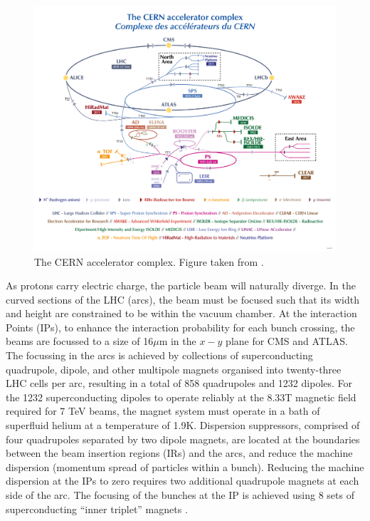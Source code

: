 \begin{figure}[t]
    \centering
    \includegraphics[width=\textwidth]{plots/lhc/CCC-v2022.png}
    \caption{The CERN accelerator complex. Figure taken from \cite{LHC:CCC}.\label{fig:LHC:ccc}}
\end{figure}
As protons carry electric charge, the particle beam will naturally diverge. In the curved sections of the LHC (arcs), the beam must be focused such that its width and height are constrained to be within the vacuum chamber. At the interaction Points (IPs), to enhance the interaction probability for each bunch crossing, the beams are focussed to a size of 16$\mu$m in the $x-y$ plane for CMS and ATLAS. The focussing in the arcs is achieved by collections of superconducting quadrupole, dipole, and other multipole magnets organised into twenty-three LHC cells per arc, resulting in a total of 858 quadrupoles and 1232 dipoles. For the 1232 superconducting dipoles to operate reliably at the 8.33T magnetic field required for 7 TeV beams, the magnet system must operate in a bath of superfluid helium at a temperature of 1.9K. Dispersion suppressors, comprised of four quadrupoles separated by two dipole magnets, are located at the boundaries between the beam insertion regions (IRs) and the arcs, and reduce the machine dispersion (momentum spread of particles within a bunch). Reducing the machine dispersion at the IPs to zero requires two additional quadrupole magnets at each side of the arc. The focusing of the bunches at the IP is achieved using 8 sets of superconducting ``inner triplet'' magnets \cite{LHC:magnets1,LHC:magnets2,LHC:design}. 
